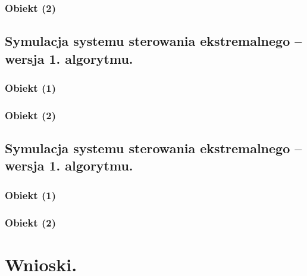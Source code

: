 \documentclass[a4paper,10pt]{article}
\begin{document}
\subsubsection{Obiekt (2)}
\subsection{Symulacja systemu sterowania ekstremalnego – wersja 1. algorytmu.}

\subsubsection{Obiekt (1)}

\subsubsection{Obiekt (2)}
\subsection{Symulacja systemu sterowania ekstremalnego – wersja 1. algorytmu.}

\subsubsection{Obiekt (1)}

\subsubsection{Obiekt (2)}
\section{Wnioski.}\label{sec:wnioski}
\end{document}
